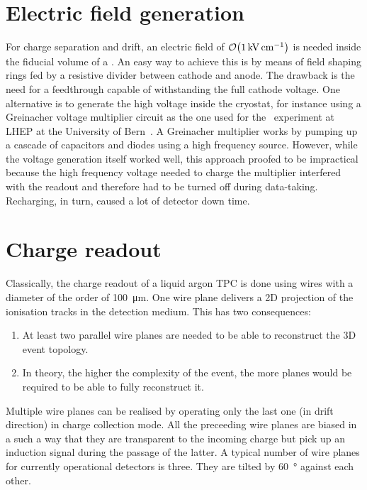 \section{Electric field generation\label{sec:lartpc_efield}}

For charge separation and drift, an electric field of $\order{\SI{1}{\kilo\volt\per\centi\metre}}$ is needed inside the fiducial volume of a \lartpc.
An easy way to achieve this is by means of field shaping rings fed by a resistive divider between cathode and anode.
The drawback is the need for a feedthrough capable of withstanding the full cathode voltage.
One alternative is to generate the high voltage inside the cryostat, for instance using a Greinacher voltage multiplier circuit as the one used for the \AT\ experiment at LHEP at the University of Bern~\cite{AT}.
A Greinacher multiplier works by pumping up a cascade of capacitors and diodes using a high frequency source.
However, while the voltage generation itself worked well, this approach proofed to be impractical because the high frequency voltage needed to charge the multiplier interfered with the readout and therefore had to be turned off during data-taking.
Recharging, in turn, caused a lot of detector down time.


\section{Charge readout\label{sec:lartpc_charge-ro}}

Classically, the charge readout of a liquid argon TPC is done using wires with a diameter of the order of \SI{100}{\micro\metre}.
One wire plane delivers a 2D projection of the ionisation tracks in the detection medium.
This has two consequences:
\begin{enumerate}
	\item At least two parallel wire planes are needed to be able to reconstruct the 3D event topology.
	\item In theory, the higher the complexity of the event, the more planes would be required to be able to fully reconstruct it.
\end{enumerate}
Multiple wire planes can be realised by operating only the last one (in drift direction) in charge collection mode.
All the preceeding wire planes are biased in a such a way that they are transparent to the incoming charge but pick up an induction signal during the passage of the latter.
A typical number of wire planes for currently operational detectors is three.
They are tilted by \SI{60}{\degree} against each other.


